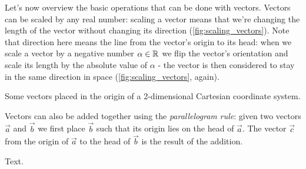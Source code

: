 Let's now overview the basic operations that can be done with vectors. Vectors can be scaled by any real number: scaling a vector means that we're changing the length of the vector without changing its direction (\cref{fig:scaling_vectors}). Note that direction here means the line from the vector's origin to its head: when we scale a vector by a negative number $\alpha\in\mathbb{R}^{}$ we flip the vector's orientation and scale its length by the absolute value of $\alpha$ - the vector is then considered to stay in the same direction in space (\cref{fig:scaling_vectors}, again).

\begin{marginfigure}
    \caption{Some vectors placed in the origin of a 2-dimensional Cartesian coordinate system.}
    \label{fig:scaling_vectors}
\end{marginfigure}

Vectors can also be added together using the \textit{parallelogram rule}: given two vectors $\vec{a}$ and $\vec{b}$ we first place $\vec{b}$ such that its origin lies on the head of $\vec{a}$. The vector $\vec{c}$ from the origin of $\vec{a}$ to the head of $\vec{b}$ is the result of the addition.

\begin{marginfigure}
    \caption{Text.}
    \label{fig:adding_vectors}
\end{marginfigure}

\lipsum[2-6]
